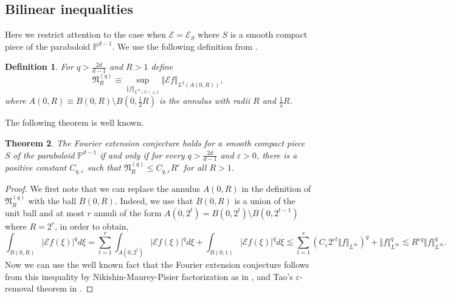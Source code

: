 \documentclass{amsart}%
\newtheorem{theorem}{Theorem}
\theoremstyle{plain}
\newtheorem{definition}[theorem]{Definition}
\numberwithin{equation}{section}
\begin{document}
\subsection{Bilinear inequalities}

Here we restrict attention to the case when $\mathcal{E}=\mathcal{E}_{S}$
where $S$ is a smooth compact piece of the paraboloid $\mathbb{P}^{d-1}$. We
use the following definition from \cite{BoGu}.

\begin{definition}
For $q>\frac{2d}{d-1}$ and $R>1$ define%
\[
\mathfrak{N}_{R}^{\left(  q\right)  }\equiv\sup_{\left\Vert f\right\Vert
_{L^{\infty}\left(  U\right)  \leq1}}\left\Vert \mathcal{E}f\right\Vert
_{L^{q}\left(  A\left(  0,R\right)  \right)  },
\]
where $A\left(  0,R\right)  \equiv B\left(  0,R\right)  \setminus B\left(
0,\frac{1}{2}R\right)  $ is the annulus with radii $R$ and $\frac{1}{2}R$.
\end{definition}

The following theorem is well known.

\begin{theorem}
\label{main}The Fourier extension conjecture holds for a smooth compact piece
$S$ of the paraboloid $\mathbb{P}^{d-1}$ \emph{if and only if} for every
$q>\frac{2d}{d-1}$ and $\varepsilon>0$, there is a positive constant
$C_{q,\varepsilon}$ such that $\mathfrak{N}_{R}^{\left(  q\right)  }\leq
C_{q,\varepsilon}R^{\varepsilon}$ for all $R>1$.
\end{theorem}

\begin{proof}
We first note that we can replace the annulus $A\left(  0,R\right)  $ in the
definition of $\mathfrak{N}_{R}^{\left(  q\right)  }$ with the ball $B\left(
0,R\right)  $. Indeed, we use that $B\left(  0,R\right)  $ is a union of the
unit ball and at most $r$ annuli of the form $A\left(  0,2^{t}\right)
=B\left(  0,2^{t}\right)  \setminus B\left(  0,2^{t-1}\right)  $ where
$R=2^{r}$, in order to obtain,%
\[
\int_{B\left(  0,R\right)  }\left\vert \mathcal{E}f\left(  \xi\right)
\right\vert ^{q}d\xi=\sum_{t=1}^{r}\int_{A\left(  0,2^{t}\right)  }\left\vert
\mathcal{E}f\left(  \xi\right)  \right\vert ^{q}d\xi+\int_{B\left(
0,1\right)  }\left\vert \mathcal{E}f\left(  \xi\right)  \right\vert ^{q}%
d\xi\lesssim\sum_{t=1}^{r}\left(  C_{\varepsilon}2^{\varepsilon t}\left\Vert
f\right\Vert _{L^{\infty}}\right)  ^{q}+\left\Vert f\right\Vert _{L^{\infty}%
}^{q}\lesssim R^{\varepsilon q}\left\Vert f\right\Vert _{L^{\infty}}^{q}.
\]
Now we can use the well known fact that the Fourier extension conjecture
follows from this inequality by Nikishin-Maurey-Pisier factorization as in
\cite{Bou}, and Tao's $\varepsilon$-removal theorem in \cite{Tao1}.
\end{proof}
\end{document}
